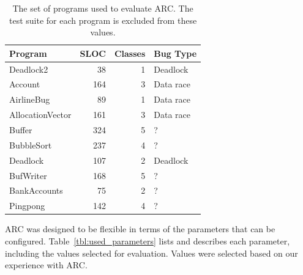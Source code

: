 \documentclass{llncs}
\begin{document}
\begin{table}[!h]
\caption{The set of programs used to evaluate ARC. The test suite for each
program is excluded from these values.}
\begin{center}
\begin{tabular}{|l|r|r|l|}
\hline
\textbf{Program} &
\textbf{SLOC} &
\textbf{Classes} &
\textbf{Bug Type}
\\\hline
Deadlock2 & 38 & 1 & Deadlock
\\\hline
Account & 164 & 3 & Data race
\\\hline
AirlineBug & 89 & 1 & Data race
\\\hline
AllocationVector & 161 & 3 & Data race
\\\hline
Buffer & 324 & 5 & ?
\\\hline
BubbleSort & 237 & 4 & ?
\\\hline
Deadlock & 107 & 2 & Deadlock
\\\hline
BufWriter& 168 & 5 & ?
\\\hline
BankAccounts & 75 & 2 & ?
\\\hline
Pingpong & 142 & 4 & ?
\\\hline
\end{tabular}
\label{tbl:used_programs}
\end{center}
\end{table}

ARC was designed to be flexible in terms of the parameters that can be
configured. Table~\ref{tbl:used_parameters} lists and describes each parameter,
including the values selected for evaluation. Values were selected based on our
experience with ARC.
\end{document}
